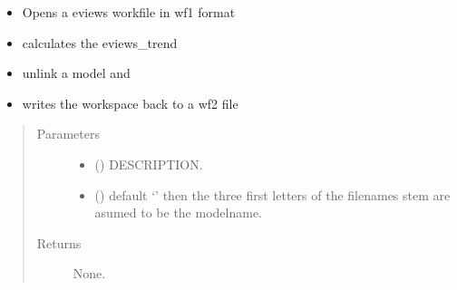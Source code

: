 \documentclass[letterpaper,10pt,english]{sphinxmanual}
\begin{document}
\begin{fulllineitems}
\label{\detokenize{index:modelgrabwf2.wf1_to_wf2}}
\pysigstartsignatures
{}
\pysigstopsignatures\begin{itemize}
\item {} 
\sphinxAtStartPar
Opens a eviews workfile in wf1 format

\item {} 
\sphinxAtStartPar
calculates the eviews\_trend

\item {} 
\sphinxAtStartPar
unlink a model and

\item {} 
\sphinxAtStartPar
writes the workspace back to a wf2 file

\end{itemize}
\begin{quote}\begin{description}
\item[{Parameters}] \leavevmode\begin{itemize}
\item {} 
\sphinxAtStartPar
{} () \textendash{} DESCRIPTION.

\item {} 
\sphinxAtStartPar
{} () \textendash{} default ‘’ then the three first letters of the filenames stem are asumed to be the modelname.

\end{itemize}

\item[{Returns}] \leavevmode
\sphinxAtStartPar
None.

\end{description}\end{quote}

\end{fulllineitems}

\end{document}
